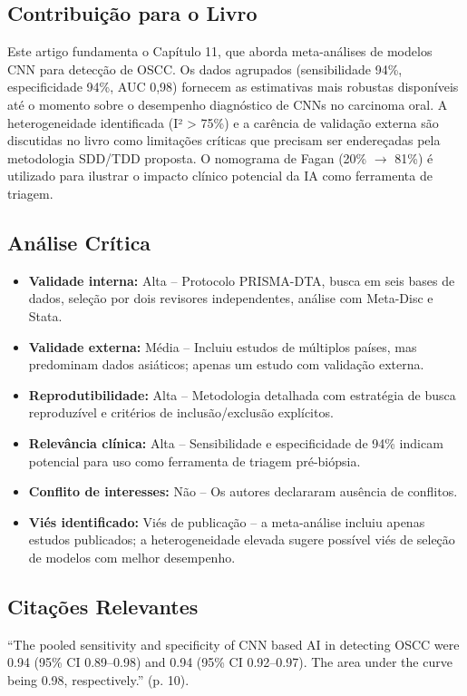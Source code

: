 \subsection{Contribuição para o Livro}
Este artigo fundamenta o Capítulo 11, que aborda meta-análises de modelos CNN
para detecção de OSCC. Os dados agrupados (sensibilidade 94\%, especificidade
94\%, AUC 0,98) fornecem as estimativas mais robustas disponíveis até o momento
sobre o desempenho diagnóstico de CNNs no carcinoma oral. A heterogeneidade
identificada (I² > 75\%) e a carência de validação externa são discutidas no
livro como limitações críticas que precisam ser endereçadas pela metodologia
SDD/TDD proposta. O nomograma de Fagan (20\% $\rightarrow$ 81\%) é utilizado
para ilustrar o impacto clínico potencial da IA como ferramenta de triagem.

\subsection{Análise Crítica}
\begin{itemize}
  \item \textbf{Validade interna:} Alta -- Protocolo PRISMA-DTA, busca em seis
        bases de dados, seleção por dois revisores independentes, análise com
        Meta-Disc e Stata.
  \item \textbf{Validade externa:} Média -- Incluiu estudos de múltiplos países,
        mas predominam dados asiáticos; apenas um estudo com validação externa.
  \item \textbf{Reprodutibilidade:} Alta -- Metodologia detalhada com estratégia
        de busca reproduzível e critérios de inclusão/exclusão explícitos.
  \item \textbf{Relevância clínica:} Alta -- Sensibilidade e especificidade de
        94\% indicam potencial para uso como ferramenta de triagem pré-biópsia.
  \item \textbf{Conflito de interesses:} Não -- Os autores declararam ausência de
        conflitos.
  \item \textbf{Viés identificado:} Viés de publicação -- a meta-análise incluiu
        apenas estudos publicados; a heterogeneidade elevada sugere possível
        viés de seleção de modelos com melhor desempenho.
\end{itemize}

\subsection{Citações Relevantes}
\begin{citacao}
``The pooled sensitivity and specificity of CNN based AI in detecting OSCC were
0.94 (95\% CI 0.89--0.98) and 0.94 (95\% CI 0.92--0.97). The area under the
curve being 0.98, respectively.'' (p. 10).
\end{citacao}


